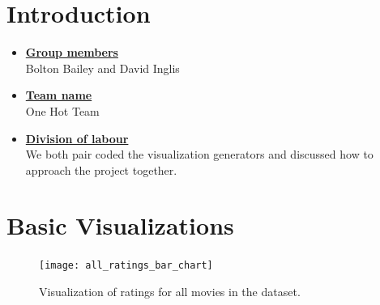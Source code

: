 \newif\ifshowsolutions
\showsolutionstrue

\newcommand{\boldline}[1]{\underline{\textbf{#1}}}



\pagestyle{fancy}





\pagebreak
\section{Introduction}
\medskip
\begin{itemize}

    \item \boldline{Group members} \\
    Bolton Bailey and David Inglis

    \item \boldline{Team name} \\
    One Hot Team

    \item \boldline{Division of labour} \\
    We both pair coded the  visualization generators and discussed how to approach the project together.

\end{itemize}


\pagebreak
\section{Basic Visualizations}
\medskip



\begin{figure}[H]
\centering
\texttt{[image: all\_ratings\_bar\_chart]}
\caption{Visualization of ratings for all movies in the dataset.}
\end{figure}



